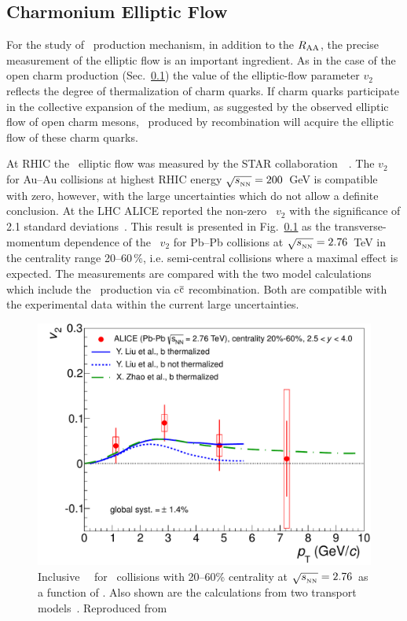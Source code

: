 \subsection{Charmonium Elliptic Flow}

For the study of \Jpsi\ production mechanism, in addition to the $R_{\rm AA}$, the precise measurement of the elliptic flow is an important ingredient. As in the case of the open charm production (Sec.~\ref{}) the value of the elliptic-flow parameter $v_2$ reflects the degree of thermalization of charm quarks. If charm quarks participate in the collective expansion of the medium, as suggested by the observed elliptic flow of open charm mesons, \jpsi\ produced by recombination will acquire the elliptic flow of these charm quarks.

At RHIC the \Jpsi\ elliptic flow was measured by the STAR collaboration~~\cite{Adamczyk:2012pw}. The $v_2$ for Au--Au collisions at highest RHIC energy $\sqrt{s_{_{\rm NN}}} = 200$~GeV is compatible with zero, however, with the large uncertainties which do not allow a definite conclusion. At the LHC ALICE reported the non-zero \Jpsi\ $v_2$ with the significance of 2.1 standard deviations~\cite{ALICE:2013xna}. This result is presented in Fig.~\ref{} as the transverse-momentum dependence of the \Jpsi\ $v_2$ for Pb--Pb collisions at $\sqrt{s_{_{\rm NN}}} = 2.76$~TeV in the centrality range 20--60\,\%, i.e. semi-central collisions where a maximal effect is expected. The measurements are compared with the two model calculations~\cite{Liu:2009gx,Zhao:2012gc} which include the \Jpsi\ production via c$\overline{\rm c}$ recombination. Both are compatible with the experimental data within the current large uncertainties. 

\begin{figure}
\begin{center}
\includegraphics[width=0.49\linewidth]{quarkoniafigs/prl_fig4-eps-converted-to.pdf}
\caption{\label{fig:GR:v2ptcomp} Inclusive \jpsi\ \vtwo\
for \PbPb\ collisions with 20--60\% centrality at $\sqrt{s_{_{\rm NN}}} = 2.76$\TeV\ as a function of \pT.
Also shown are the calculations from two transport models~\cite{Liu:2009gx,Zhao:2012gc}.
Reproduced from~\cite{ALICE:2013xna}}
\end{center}
\end{figure}

